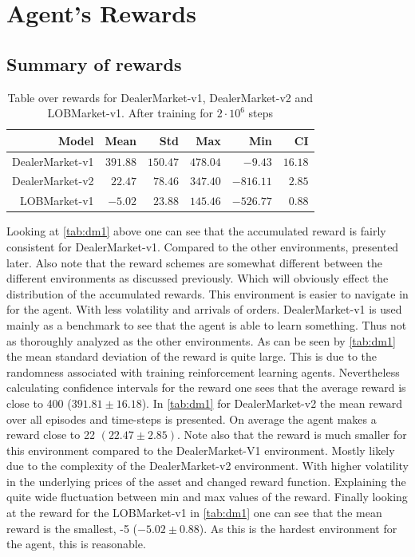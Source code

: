 \documentclass{kththesis}
\theoremstyle{definition}
\begin{document}
\newpage
\section{Agent's Rewards}

\subsection*{Summary of rewards}
\begin{table}[H]
\centering
\begin{tabular}{rrrrrr}
  \hline
 \textbf{Model} & \textbf{Mean} & \textbf{Std} & \textbf{Max} & \textbf{Min} & \textbf{CI} \\ 
  \hline
DealerMarket-v1 & $391.88$ & $150.47$ & $478.04$ & $-9.43$ & $16.18$ \\
DealerMarket-v2 & $22.47$ & $78.46$ & $347.40$ & $-816.11$ & $2.85$  \\
LOBMarket-v1& $-5.02$ & $23.88$ & $145.46$ & $-526.77$ & $0.88$ \\ 

   \hline
\end{tabular}
\caption{Table over rewards for DealerMarket-v1, DealerMarket-v2 and LOBMarket-v1. After training for $2\cdot10^6$ steps}
\label{tab:dm1}
\end{table}
Looking at \autoref{tab:dm1} above one can see that the accumulated reward is fairly consistent for DealerMarket-v1. Compared to the other environments, presented later. Also note that the reward schemes are somewhat different between the different environments as discussed previously. Which will obviously effect the distribution of the accumulated rewards. This environment is easier to navigate in for the agent. With less volatility and arrivals of orders. 
\newline
\newline
DealerMarket-v1 is used mainly as a benchmark to see that the agent is able to learn something. Thus not as thoroughly analyzed as the other environments. As can be seen by \autoref{tab:dm1} the mean standard deviation of the reward is quite large. This is due to the randomness associated with training reinforcement learning agents. Nevertheless calculating confidence intervals for the reward one sees that the average reward is close to 400 ($391.81 \pm 16.18$).
\newline
\newline
In \autoref{tab:dm1} for DealerMarket-v2 the mean reward over all episodes and time-steps is presented. On average the agent makes a reward close to 22 $(22.47 \pm 2.85)$. Note also that the reward is much smaller for this environment compared to the DealerMarket-V1 environment. Mostly likely due to the complexity of the DealerMarket-v2 environment. With higher volatility in the underlying prices of the asset and changed reward function. Explaining the quite wide fluctuation between min and max values of the reward. Finally looking at the reward for the LOBMarket-v1 in \autoref{tab:dm1} one can see that the mean reward is the smallest, -5 ($-5.02 \pm 0.88$). As this is the hardest environment for the agent, this is reasonable.
\end{document}
